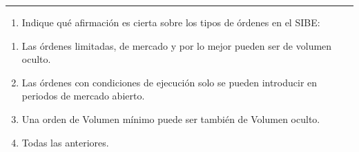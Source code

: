 \documentclass[
  letterpaper,
  DIV=11,
  numbers=noendperiod]{scrreprt}
\providecommand{\tightlist}{%
  \setlength{\itemsep}{0pt}\setlength{\parskip}{0pt}}\usepackage{longtable,booktabs,array}
\begin{document}
\begin{center}\rule{0.5\linewidth}{0.5pt}\end{center}

\begin{enumerate}
\def\labelenumi{\arabic{enumi}.}
\setcounter{enumi}{15}
\tightlist
\item
  Indique qué afirmación es cierta sobre los tipos de órdenes en el
  SIBE:
\end{enumerate}

\begin{enumerate}
\def\labelenumi{\alph{enumi})}
\item
  Las órdenes limitadas, de mercado y por lo mejor pueden ser de volumen
  oculto.
\item
  Las órdenes con condiciones de ejecución solo se pueden introducir en
  periodos de mercado abierto.
\item
  Una orden de Volumen mínimo puede ser también de Volumen oculto.
\item
  Todas las anteriores.
\end{enumerate}
\end{document}
